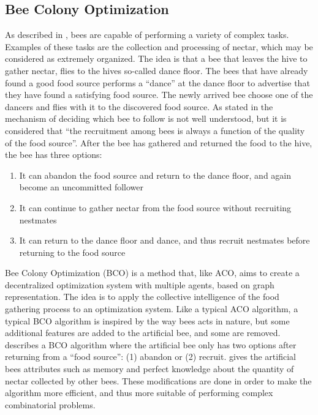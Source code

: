 \subsection{Bee Colony Optimization}
\label{subsec:BCO}
As described in \citet{lucic03}, bees are capable of performing a variety of complex tasks. Examples of these tasks are the collection and processing of nectar, which may be considered as extremely organized. The idea is that a bee that leaves the hive to gather nectar, flies to the hives so-called dance floor. The bees that have already found a good food source performs a ``dance'' at the dance floor to advertise that they have found a satisfying food source. The newly arrived bee choose one of the dancers and flies with it to the discovered food source. As stated in \citet{lucic03} the mechanism of deciding which bee to follow is not well understood, but it is considered that ``the recruitment among bees is always a function of the quality of the food source''. After the bee has gathered and returned the food to the hive, the bee has three options\citep{lucic03}:

\begin{enumerate}
  \item It can abandon the food source and return to the dance floor, and again become an uncommitted follower
  \item It can continue to gather nectar from the food source without recruiting nestmates
  \item It can return to the dance floor and dance, and thus recruit nestmates before returning to the food source
\end{enumerate}

Bee Colony Optimization (BCO) is a method that, like ACO, aims to create a decentralized optimization system with multiple agents, based on graph representation. The idea is to apply the collective intelligence of the food gathering process to an optimization system. Like a typical ACO algorithm, a typical BCO algorithm is inspired by the way bees acts in nature, but some additional features are added to the artificial bee, and some are removed. \citet{nikolic14} describes a BCO algorithm where the artificial bee only has two options after returning from a ``food source'': (1) abandon or (2) recruit. \citet{lucic03} gives the artificial bees attributes such as memory and perfect knowledge about the quantity of nectar collected by other bees. These modifications are done in order to make the algorithm more efficient, and thus more suitable of performing complex combinatorial problems.

